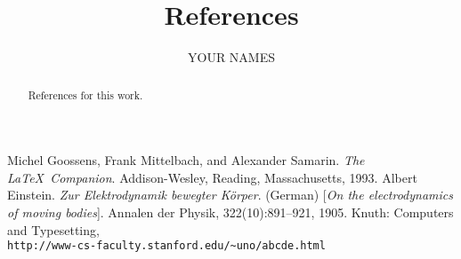 \documentclass{ximera}
\author{YOUR NAMES}
\title{References}
\begin{document}
\begin{abstract}
References for this work.
\end{abstract}
\maketitle
\begin{thebibliography}{9}
     Michel Goossens, Frank Mittelbach, and Alexander Samarin. \textit{The \LaTeX\ Companion}. Addison-Wesley, Reading, Massachusetts, 1993.
     Albert Einstein. \textit{Zur Elektrodynamik bewegter K{\"o}rper}. (German) [\textit{On the electrodynamics of moving bodies}]. Annalen der Physik, 322(10):891–921, 1905.
     Knuth: Computers and Typesetting,\\\texttt{http://www-cs-faculty.stanford.edu/\~{}uno/abcde.html}
    \end{thebibliography}
\end{document}
